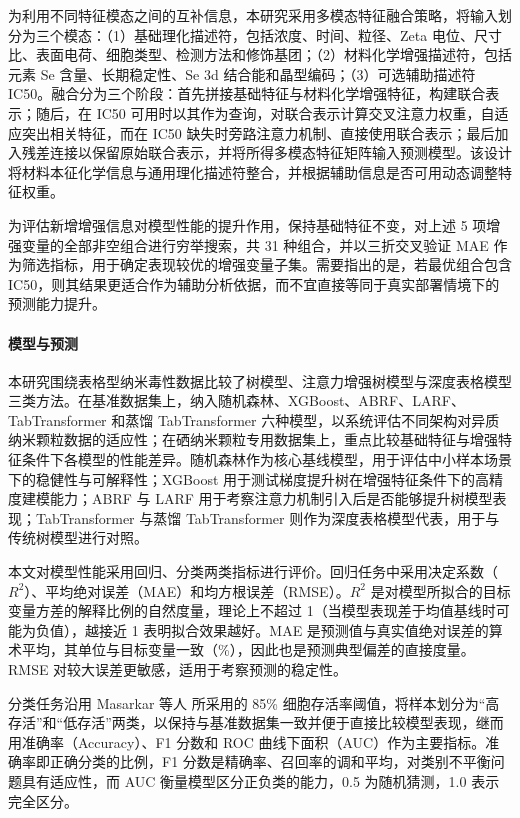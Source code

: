 \documentclass[letterpaper]{article}
\begin{document}
为利用不同特征模态之间的互补信息，本研究采用多模态特征融合策略，将输入划分为三个模态：（1）基础理化描述符，包括浓度、时间、粒径、Zeta 电位、尺寸比、表面电荷、细胞类型、检测方法和修饰基团；（2）材料化学增强描述符，包括元素 Se 含量、长期稳定性、Se 3d 结合能和晶型编码；（3）可选辅助描述符 IC50。融合分为三个阶段：首先拼接基础特征与材料化学增强特征，构建联合表示；随后，在 IC50 可用时以其作为查询，对联合表示计算交叉注意力权重，自适应突出相关特征，而在 IC50 缺失时旁路注意力机制、直接使用联合表示；最后加入残差连接以保留原始联合表示，并将所得多模态特征矩阵输入预测模型。该设计将材料本征化学信息与通用理化描述符整合，并根据辅助信息是否可用动态调整特征权重。

为评估新增增强信息对模型性能的提升作用，保持基础特征不变，对上述 5 项增强变量的全部非空组合进行穷举搜索，共 31 种组合，并以三折交叉验证 MAE 作为筛选指标，用于确定表现较优的增强变量子集。需要指出的是，若最优组合包含 IC50，则其结果更适合作为辅助分析依据，而不宜直接等同于真实部署情境下的预测能力提升。

\paragraph{模型与预测}
本研究围绕表格型纳米毒性数据比较了树模型、注意力增强树模型与深度表格模型三类方法。在基准数据集上，纳入随机森林、XGBoost、ABRF、LARF、TabTransformer 和蒸馏 TabTransformer 六种模型，以系统评估不同架构对异质纳米颗粒数据的适应性；在硒纳米颗粒专用数据集上，重点比较基础特征与增强特征条件下各模型的性能差异。随机森林作为核心基线模型，用于评估中小样本场景下的稳健性与可解释性；XGBoost 用于测试梯度提升树在增强特征条件下的高精度建模能力；ABRF 与 LARF 用于考察注意力机制引入后是否能够提升树模型表现；TabTransformer 与蒸馏 TabTransformer 则作为深度表格模型代表，用于与传统树模型进行对照。

本文对模型性能采用回归、分类两类指标进行评价。回归任务中采用决定系数（\(R^2\)）、平均绝对误差（MAE）和均方根误差（RMSE）。\(R^2\) 是对模型所拟合的目标变量方差的解释比例的自然度量，理论上不超过 1（当模型表现差于均值基线时可能为负值），越接近 1 表明拟合效果越好。MAE 是预测值与真实值绝对误差的算术平均，其单位与目标变量一致（\%），因此也是预测典型偏差的直接度量。RMSE 对较大误差更敏感，适用于考察预测的稳定性。

分类任务沿用 Masarkar 等人\cite{masarkar2024} 所采用的 85\% 细胞存活率阈值，将样本划分为“高存活”和“低存活”两类，以保持与基准数据集一致并便于直接比较模型表现，继而用准确率（Accuracy）、F1 分数和 ROC 曲线下面积（AUC）作为主要指标。准确率即正确分类的比例，F1 分数是精确率、召回率的调和平均，对类别不平衡问题具有适应性，而 AUC 衡量模型区分正负类的能力，0.5 为随机猜测，1.0 表示完全区分。
\end{document}
